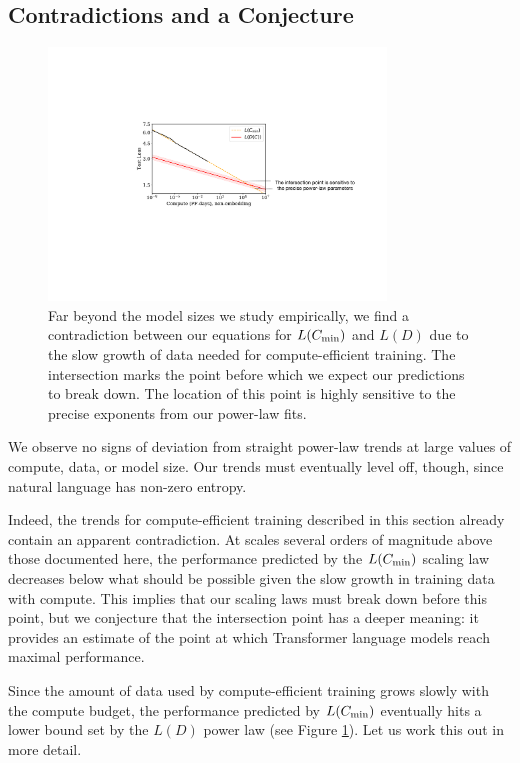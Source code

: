 \documentclass[english]{article}
\begin{document}
\subsection{Contradictions and a Conjecture}
\begin{figure}
\noindent \centering{}
\includegraphics[width=0.8\textwidth]{Contradiction}
\caption[Contradiction between compute and data trends]{Far beyond the model sizes we study empirically, we find a contradiction between our equations for $L(C_{\rm min})$ and $L(D)$ due to the slow growth of data needed for compute-efficient training.  The intersection marks the point before which we expect our predictions to break down.  The location of this point is highly sensitive to the precise exponents from our power-law fits. \label{fig:Contradiction}}
\end{figure}

We observe no signs of deviation from straight power-law trends at large values of compute, data, or model size. Our trends must eventually level off, though, since natural language has non-zero entropy. 

Indeed, the trends for compute-efficient training described in this section already contain an apparent contradiction. At scales several orders of magnitude above those documented here, the performance predicted by the $L(C_{\rm min})$ scaling law decreases below what should be possible given the slow growth in training data with compute.  This implies that our scaling laws must break down before this point, but we conjecture that the intersection point has a deeper meaning: it provides an estimate of the point at which Transformer language models reach maximal performance.

Since the amount of data used by compute-efficient training grows  slowly with the compute budget, the performance predicted by $L(C_{\rm min})$ eventually hits a lower bound set by the $L(D)$ power law (see Figure \ref{fig:Contradiction}).  Let us work this out in more detail.
\end{document}
